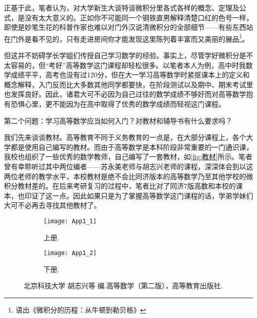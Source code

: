   \hspace*{2em}正基于此，笔者认为，对大学新生大谈特谈微积分里各式各样的概念、定理及公式，是没有太大意义的。正如你不可能同一个钢铁直男解释清楚口红的色号一样，即使是妙笔生花的科普作家也难以对门外汉说清微积分的全部细节——有些东西站在门外是看不见的，只有走进房间你才能发现这里陈列着丰富而又美丽的展品\footnote{语出《微积分的历程：从牛顿到勒贝格》}。

  \hspace*{2em}但这并不妨碍学长学姐们传授自己学习数学的经验。事实上，尽管学好微积分是不太容易的，但“考好”高等数学这门课程却轻松很多。以笔者本人为例，高中时我数学成绩平平，高考也没有过120分，但在大一学习高等数学时紧抠课本上的定义和概念解释，入门反而比大多数其他同学都要快，在阶段测试以及期中、期末考试里也发挥良好。因此，诸君大可不必因为自己过往的数学成绩不够好而对高等数学抱有恐惧心里，更不能因为在高中取得了优秀的数学成绩而轻视这门课程。

  \begin{marker}
  {\heiti 第二个问题：学习高等数学应当如何入门？对教材和辅导书有什么要求吗？}
  \end{marker}

  \hspace*{2em}我们先来谈谈教材。高等教育不同于义务教育的一点是，在大部分课程上，各个大学都是使用自己编写的教材。而由于高等数学是本科阶段非常重要的一门通识课，我校也组织了一些优秀的数学教师，自己编写了一套教材，如\autoref{fig:教材}所示。笔者曾有幸聆听过其中两位编者——苏永美老师与胡志兴老师的课程，深深体会到以这两位老师的教学水平，本校教材是绝不会比同济版本的高等数学乃至其他学校的微积分教材差的。在后来考研复习的过程中，笔者比对了同济7版高数和本校的课本，也印证了这一点。因此如果只是为了掌握高等数学这门课程的话，学弟学妹们大可不必再去寻找其他教材了。
  \begin{figure}[!htbtb]
    \centering
    \begin{subfigure}[b]{.23\textwidth}
      \centering
      \texttt{[image: App1\_1]}
      \caption{上册.}
    \end{subfigure}
    \begin{subfigure}[b]{.23\textwidth}
      \centering
      \texttt{[image: App1\_2]}
      \caption{下册.}
    \end{subfigure}
    \caption{北京科技大学 胡志兴等 编.高等数学（第二版），高等教育出版社.}\label{fig:教材}
  \end{figure}

